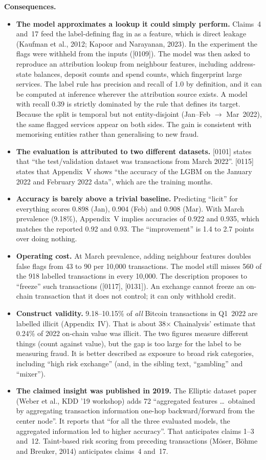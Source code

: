 \documentclass[10pt,a4paper]{article}
\begin{document}
\noindent\textbf{Consequences.}
\begin{itemize}
  \item \textbf{The model approximates a lookup it could simply perform.} Claims~4 and~17 feed the label-defining flag in as a feature, which is direct leakage (Kaufman et al., 2012; Kapoor and Narayanan, 2023). In the experiment the flags were withheld from the inputs ([0109]). The model was then asked to reproduce an attribution lookup from neighbour features, including address-state balances, deposit counts and spend counts, which fingerprint large services. The label rule has precision and recall of 1.0 by definition, and it can be computed at inference wherever the attribution source exists. A model with recall 0.39 is strictly dominated by the rule that defines its target. Because the split is temporal but not entity-disjoint (Jan--Feb $\rightarrow$ Mar~2022), the same flagged services appear on both sides. The gain is consistent with memorising entities rather than generalising to new fraud.
  \item \textbf{The evaluation is attributed to two different datasets.} [0101] states that ``the test/validation dataset was transactions from March 2022''. [0115] states that Appendix~V shows ``the accuracy of the LGBM on the January 2022 and February 2022 data'', which are the training months.
  \item \textbf{Accuracy is barely above a trivial baseline.} Predicting ``licit'' for everything scores 0.898 (Jan), 0.904 (Feb) and 0.908 (Mar). With March prevalence (9.18\%), Appendix~V implies accuracies of 0.922 and 0.935, which matches the reported 0.92 and 0.93. The ``improvement'' is 1.4 to 2.7 points over doing nothing.
  \item \textbf{Operating cost.} At March prevalence, adding neighbour features doubles false flags from 43 to 90 per 10,000 transactions. The model still misses 560 of the 918 labelled transactions in every 10,000. The description proposes to ``freeze'' such transactions ([0117], [0131]). An exchange cannot freeze an on-chain transaction that it does not control; it can only withhold credit.
  \item \textbf{Construct validity.} 9.18--10.15\% of \emph{all} Bitcoin transactions in Q1~2022 are labelled illicit (Appendix~IV). That is about 38$\times$ Chainalysis' estimate that 0.24\% of 2022 on-chain value was illicit. The two figures measure different things (count against value), but the gap is too large for the label to be measuring fraud. It is better described as exposure to broad risk categories, including ``high risk exchange'' (and, in the sibling text, ``gambling'' and ``mixer'').
  \item \textbf{The claimed insight was published in 2019.} The Elliptic dataset paper (Weber et al., KDD '19 workshop) adds 72 ``aggregated features \ldots\ obtained by aggregating transaction information one-hop backward/forward from the center node''. It reports that ``for all the three evaluated models, the aggregated information led to higher accuracy''. That anticipates claims 1--3 and~12. Taint-based risk scoring from preceding transactions (M\"oser, B\"ohme and Breuker, 2014) anticipates claims~4 and~17.
\end{itemize}
\end{document}
